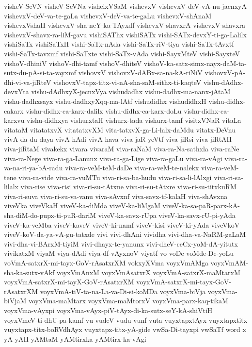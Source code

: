 {visheV-SeVN
visheV-SeVNa
vishelxVSaM
vishevxV
vishevxV-deV-vA-nu-jacnxyA
vishevxV-deV-va-te-gaLa
vishevxV-deV-va-te-gaLu
vishevxV-shAnaM
vishevxVshaH
vishevxV-sha-neY-ka-TAyxdf
vishevxV-shavxrA
vishevxV-shavxra
vishevxV-shavx-ra-liM-gavu
vishiSAThx
vishiSATx
vishi-SATx-devxY-ti-ga-Lalilx
vishiSaTx
vishiSaTxH
vishi-SaTx-nAda
vishi-SaTx-riV-tiya
vishi-SaTx-tAvxtf
vishi-SaTx-tavxmf
vishi-SaTxte
vishi-SaTx-vAda
vishi-SayxMteV
vishi-SayxteV
vishoV-dhiniV
vishoV-dhi-tamf
vishoV-dhiteV
vishoV-ka-satx-simx-nayx-daM-ta-sutx-du-pA-si-ta-vayxmf
vishovxV
vishovxV-dABx-sa-na-kA-riNiV
vishovxV-pA-dhi-vi-va-jiRteV
vishovxV-tapx-titx-vi-nA-sha-saM-sithx-ti-kaqteV
vishu-dAdhx-devxYta
vishu-dAdhxyX-jecnxVya
vishudadhx
vishu-dadhx-ma-nanx-jAtaM
vishu-dadhxsayx
vishu-dadhxyXqq-ma-lAtf
vishudidhx
vishudidhxH
vishu-didhx-cakarx
vishu-didhx-ca-karx-dalilx
vishu-didhx-ca-karx-doLu
vishu-didhx-ca-karxvu
vishu-didhxya
vishurxtaH
vishurx-tada
vishurx-tamf
visitxVNaR
vitaLa
vitataM
vitatatxvX
vitatatxvXM
vita-tatxvX-ga-Li-lalx-daMdu
vitatx-DeVnu
vivA-da-du-daya
vivA-hAdi
vivA-hava
viva-jaR-yeVtf
viva-jiRsi
viva-jiRtAH
viva-jiRtaM
vivakekx
vivara
vivaraM
viva-raNaM
viva-ra-Na-sathxla
viva-raNe
viva-ra-Nege
viva-ra-ga-Lanunx
viva-ra-ga-Lige
viva-ra-gaLu
viva-ra-vAgi
viva-ra-va-na-ri-ya-bA-radu
viva-ra-veM-teM-daDe
viva-ra-veM-te-nalekx
viva-ra-veM-tene
viva-ra-vide
viva-ra-vuMTu
viva-ri-sa-ba-hudu
viva-ri-sa-li-lAlxgi
viva-ri-sa-lilalx
viva-rise
viva-risi
viva-ri-su-tAtxne
viva-ri-su-tAtxre
viva-ri-su-titxkuRM
viva-ri-suva
viva-ri-su-va-vanu
viva-sAvxnf
viva-savx-tf-kalaH
viva-shAvxna
viveVka
viveVkaH
viveV-ka-diMda
viveV-ka-liMgaM
viveV-ka-sa-paR-parx-kA-sha-diM-do-pupx-ti-puR-dariM
viveV-ka-savx-rUpa
viveV-ka-savx-rU-pi-yAda
viveV-ka-veMba
viveV-kaveV
viveV-ki-namf
viveV-kisi
viveV-ki-yAda
viveVkoV
viveV-koV-da-ya-vA-gu-tatxde
vivi
vivi-dhAni
vividha
vivi-dha-va-NaRM-gaLaM
vivi-dha-vi-BArxM-tiyiM
vivi-dhayx-te-yanunx
vivi-dheV-ceCx-yoM-dA-yitutx
vivikatxM
viyaM
viya-dAdi
viya-df-vAyxnoV
viyatf
vo
voDe
voMde-De-yoLu
voVmA-satxrX-mi-tayx-GoV-rAsatxrXM
vokxyXVma
voyxVmAMga
voyxVmAM-sha-ka-sutx-vAkf
voyxVmAnxM
voyxVmAsatxrX
voyxVmA-satxrX-maMtarxM
voyxVmA-satxrX-mi-tayX-GoV-rAsatxrXM
voyxVmA-satxrX-mi-tayx-GoV-rAsatxrXM
voyxVmA-tiV-ta-na-La-va-Di-si-koMDa
voyxVma-biVja
voyxVma-biVjaM
voyxVma-maMtarx
voyxVma-maMtorxV
voyxVma-parx-kaq-tikaM
voyxVma-vAyxpi
voyxVma-vAyx-piV-tAyx-di-ka-sutx-seY-kA-shiVtiH
voyxVmeV-ti-dhU-pa-kamf
vu
vudeV
vudu
vunf
vuta
vuyxtapxtAyx
vuyxtapxtitx
vuyxtapx-titx-boRVdhAyx
vuyxtapx-titx-yA-gide
vwSa-Di-tayxpi
vwSaTf
word
x
yA
yAH
yAMtaM
yAMtirxka
yAMtirx-ka-vAgi
}
